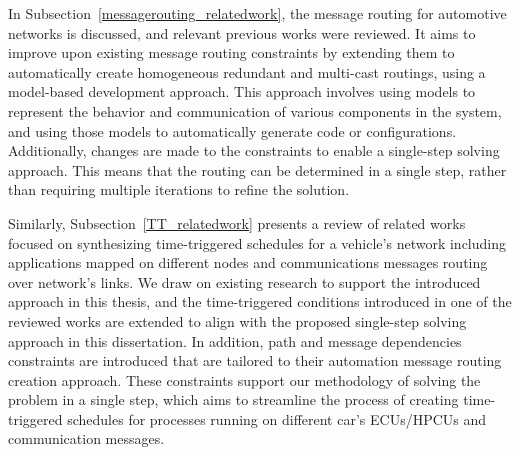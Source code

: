 In Subsection~\ref{messagerouting_relatedwork}, the message routing for automotive networks is discussed, and relevant previous works were reviewed. It aims to improve upon existing message routing constraints by extending them to automatically create homogeneous redundant and multi-cast routings, using a model-based development approach. This approach involves using models to represent the behavior and communication of various components in the system, and using those models to automatically generate code or configurations.
Additionally, changes are made to the constraints to enable a single-step solving approach. This means that the routing can be determined in a single step, rather than requiring multiple iterations to refine the solution.


Similarly, Subsection~\ref{TT_relatedwork} presents a review of related works focused on synthesizing time-triggered schedules for a vehicle's network including applications mapped on different nodes and communications messages routing over network's links. We draw on existing research to support the introduced approach in this thesis, and the time-triggered conditions introduced in one of the reviewed works are extended to align with the proposed single-step solving approach in this dissertation.
In addition, path and message dependencies constraints are introduced that are tailored to their automation message routing creation approach. These constraints support our methodology of solving the problem in a single step, which aims to streamline the process of creating time-triggered schedules for processes running on different car's ECUs/HPCUs and communication messages.



